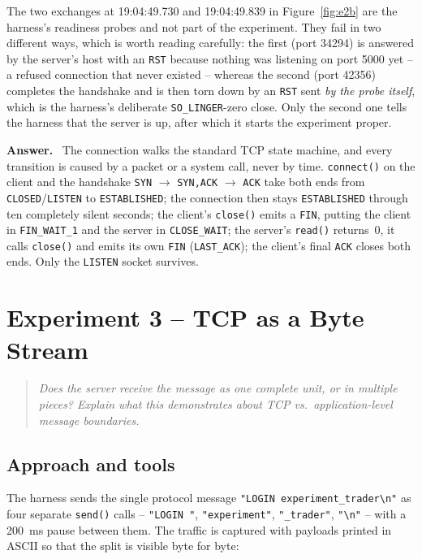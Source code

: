 \documentclass[11pt,a4paper]{article}
\newcommand{\qbox}[1]{%
  \begin{quote}\itshape #1\end{quote}%
}
\newenvironment{answer}
  {\begin{answerbox}\textbf{\color{accent}Answer.}\ }
  {\end{answerbox}}
\begin{document}
The two exchanges at 19:04:49.730 and 19:04:49.839 in Figure~\ref{fig:e2b} are the
harness's readiness probes and not part of the experiment.  They fail in two different
ways, which is worth reading carefully: the first (port 34294) is answered by the
server's host with an \texttt{RST} because nothing was listening on port 5000 yet -- a
refused connection that never existed -- whereas the second (port 42356) completes the
handshake and is then torn down by an \texttt{RST} sent \emph{by the probe itself}, which
is the harness's deliberate \texttt{SO\_LINGER}-zero close.  Only the second one tells
the harness that the server is up, after which it starts the experiment proper.

\begin{answer}
The connection walks the standard TCP state machine, and every transition is caused by
a packet or a system call, never by time.  \texttt{connect()} on the client and the
handshake \texttt{SYN} $\rightarrow$ \texttt{SYN,ACK} $\rightarrow$ \texttt{ACK} take
both ends from \texttt{CLOSED}/\texttt{LISTEN} to \texttt{ESTABLISHED}; the connection
then stays \texttt{ESTABLISHED} through ten completely silent seconds; the client's
\texttt{close()} emits a \texttt{FIN}, putting the client in \texttt{FIN\_WAIT\_1} and
the server in \texttt{CLOSE\_WAIT}; the server's \texttt{read()} returns~0, it calls
\texttt{close()} and emits its own \texttt{FIN} (\texttt{LAST\_ACK}); the client's final
\texttt{ACK} closes both ends.  Only the \texttt{LISTEN} socket survives.
\end{answer}

\section{Experiment 3 -- TCP as a Byte Stream}

\qbox{Does the server receive the message as one complete unit, or in multiple pieces?
Explain what this demonstrates about TCP vs.\ application-level message boundaries.}

\subsection*{Approach and tools}

The harness sends the single protocol message
\texttt{"LOGIN experiment\_trader\textbackslash n"} as
four separate \texttt{send()} calls -- \texttt{"LOGIN~"}, \texttt{"experiment"},
\texttt{"\_trader"}, \texttt{"\textbackslash n"} -- with a 200~ms pause between them.  The traffic is
captured with payloads printed in ASCII so that the split is visible byte for byte:
\end{document}
